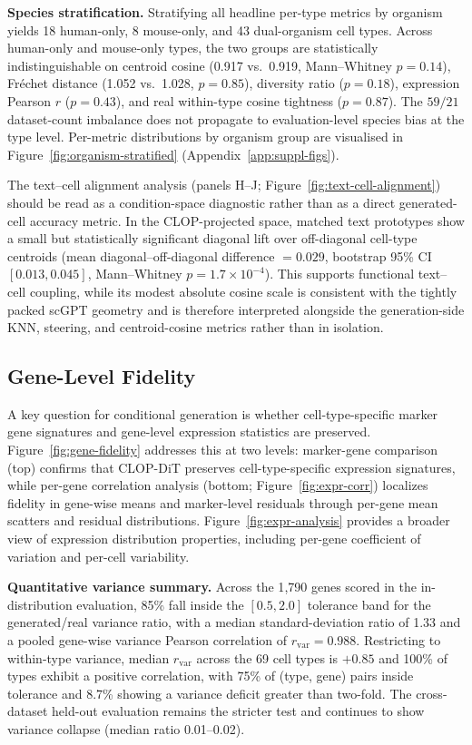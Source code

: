 \documentclass[11pt,a4paper]{article}
\begin{document}
\textbf{Species stratification.} Stratifying all headline per-type metrics by organism yields 18 human-only, 8 mouse-only, and 43 dual-organism cell types. Across human-only and mouse-only types, the two groups are statistically indistinguishable on centroid cosine (0.917 vs.\ 0.919, Mann--Whitney $p = 0.14$), Fr\'echet distance (1.052 vs.\ 1.028, $p = 0.85$), diversity ratio ($p = 0.18$), expression Pearson $r$ ($p = 0.43$), and real within-type cosine tightness ($p = 0.87$). The $59/21$ dataset-count imbalance does not propagate to evaluation-level species bias at the type level. Per-metric distributions by organism group are visualised in Figure~\ref{fig:organism-stratified} (Appendix~\ref{app:suppl-figs}).

The text--cell alignment analysis (panels H--J; Figure~\ref{fig:text-cell-alignment}) should be read as a condition-space diagnostic rather than as a direct generated-cell accuracy metric. In the CLOP-projected space, matched text prototypes show a small but statistically significant diagonal lift over off-diagonal cell-type centroids (mean diagonal--off-diagonal difference $=0.029$, bootstrap 95\% CI $[0.013,0.045]$, Mann--Whitney $p=1.7\times10^{-4}$). This supports functional text--cell coupling, while its modest absolute cosine scale is consistent with the tightly packed scGPT geometry and is therefore interpreted alongside the generation-side KNN, steering, and centroid-cosine metrics rather than in isolation.

\subsection{Gene-Level Fidelity}

A key question for conditional generation is whether cell-type-specific marker gene signatures and gene-level expression statistics are preserved. Figure~\ref{fig:gene-fidelity} addresses this at two levels: marker-gene comparison (top) confirms that CLOP-DiT preserves cell-type-specific expression signatures, while per-gene correlation analysis (bottom; Figure~\ref{fig:expr-corr}) localizes fidelity in gene-wise means and marker-level residuals through per-gene mean scatters and residual distributions. Figure~\ref{fig:expr-analysis} provides a broader view of expression distribution properties, including per-gene coefficient of variation and per-cell variability.

\textbf{Quantitative variance summary.} Across the 1{,}790 genes scored in the in-distribution evaluation, 85\% fall inside the $[0.5, 2.0]$ tolerance band for the generated/real variance ratio, with a median standard-deviation ratio of 1.33 and a pooled gene-wise variance Pearson correlation of $r_\text{var} = 0.988$. Restricting to within-type variance, median $r_\text{var}$ across the 69 cell types is $+0.85$ and 100\% of types exhibit a positive correlation, with 75\% of (type, gene) pairs inside tolerance and 8.7\% showing a variance deficit greater than two-fold. The cross-dataset held-out evaluation remains the stricter test and continues to show variance collapse (median ratio 0.01--0.02).
\end{document}
